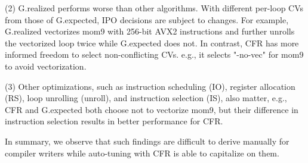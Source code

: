 \vspace{.25em}
\noindent (2) G.realized performs worse than other algorithms.
With different per-loop CVs from those of G.expected, IPO decisions are subject to changes. For example, G.realized vectorizes mom9 with 256-bit AVX2 instructions and further unrolls the vectorized loop twice while G.expected does not. In contrast, \toolname CFR has more informed freedom to select non-conflicting CVs. e.g., it selects "-no-vec" for mom9 to avoid vectorization.
  

\vspace{.25em}
\noindent (3) Other optimizations, such as instruction scheduling (IO), register
  allocation (RS), loop unrolling (unroll), and instruction selection (IS), also
  matter, e.g., CFR and G.expected both choose not to
  vectorize mom9, but their difference in instruction selection
  results in better performance for CFR.

In summary, we observe that such findings are difficult to derive
manually for compiler writers while auto-tuning with \toolname CFR is
able to capitalize on them.
